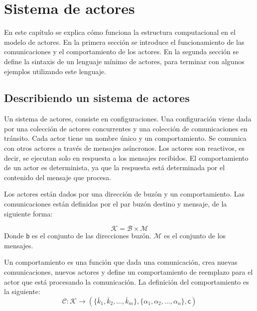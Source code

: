 \chapter{Sistema de actores}

En este capítulo se explica cómo funciona la estructura computacional en el modelo de actores. En la primera sección se introduce el funcionamiento de las comunicaciones y el comportamiento de los actores. En la segunda sección se define la sintaxis de un lenguaje mínimo de actores, para terminar con algunos ejemplos utilizando este lenguaje.

\section{Describiendo un sistema de actores}
Un sistema de actores, consiste en configuraciones. Una configuración viene dada por una colección de actores concurrentes y una colección de comunicaciones en tránsito. Cada actor tiene un nombre único y un comportamiento. Se comunica con otros actores a través de mensajes asíncronos. Los actores son reactivos, es decir, se ejecutan solo en respuesta a los mensajes recibidos. El comportamiento de un actor es determinista, ya que la respuesta está determinada por el contenido del mensaje que procesa. 

Los actores están dados por una dirección de buzón y un comportamiento. Las comunicaciones están definidas por el par buzón destino y mensaje, de la siguiente forma:

\newcommand{\COMUNICACIONES}{\mathcal{K}}
\newcommand{\COMUNICACION}{\bar{k}}
\newcommand{\BUZONES}{\mathcal{B}}
\newcommand{\BUZONESSUB}{\mathsf{B}}
\newcommand{\BUZON}{\mathsf{b}}
\newcommand{\MENSAJES}{\mathcal{M}}
\newcommand{\MENSAJE}{\mathsf{m}}

\newcommand{\ACTOR}{\alpha}
\newcommand{\COMPORTAMIENTOS}{\mathcal{C}}
\newcommand{\COMPORTAMIENTO}{\mathsf{c}}
\newcommand{\COMNOPROC}{\kappa}
\[
\COMUNICACIONES = \BUZONES \times \MENSAJES
\]
Donde $\BUZON$ es el conjunto de las direcciones buzón. $\MENSAJES$ es el conjunto de los mensajes. 

Un comportamiento es una función que dada una comunicación, crea nuevas comunicaciones, nuevos actores y define un comportamiento de reemplazo para el actor que está procesando la comunicación. La definición del comportamiento es la siguiente:
\[
\COMPORTAMIENTOS : \COMUNICACIONES \rightarrow ( \{ \COMUNICACION_1, \COMUNICACION_2, \ldots, \COMUNICACION_m \}, \{ \ACTOR_1, \ACTOR_2, \ldots, \ACTOR_n \}, \COMPORTAMIENTO )
\]

